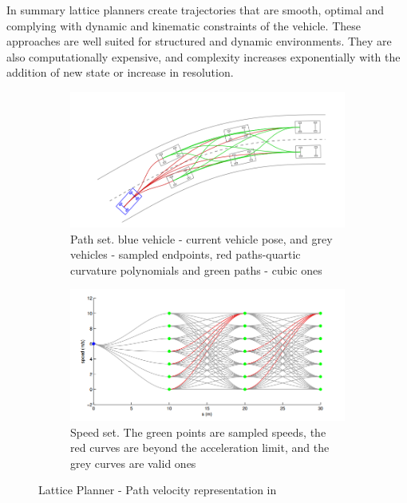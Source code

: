 In summary lattice planners create trajectories that are smooth, optimal and complying with dynamic and kinematic constraints of the vehicle. These approaches are well suited for structured and dynamic environments. They are also computationally expensive, and complexity increases exponentially with the addition of new state or increase in resolution.

\begin{figure}
	\centering
	\begin{subfigure}{.52\textwidth}
		\centering
		\includegraphics[width=1.0\linewidth]{Images/related_work/traj_optim_1.png}
		\caption{Path set. blue vehicle - current vehicle pose, and grey vehicles - sampled endpoints, red paths-quartic curvature polynomials and green paths - cubic ones}
		\label{trajoptsub1}
	\end{subfigure}%
	\begin{subfigure}{.48\textwidth}
		\centering
		\includegraphics[width=1.0\linewidth]{Images/related_work/traj_optim_2.png}
		\caption{Speed set. The green points are sampled speeds, the
red curves are beyond the acceleration limit, and the grey
curves are valid ones}
		\label{trajoptsub2}
	\end{subfigure}
	\caption{Lattice Planner - Path velocity representation in \cite{traj_planner_optimization}}
	\label{trajopt}
\end{figure}

